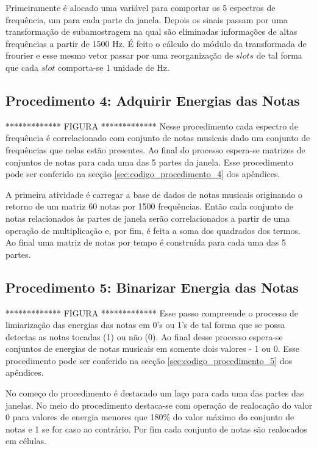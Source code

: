 Primeiramente é alocado uma variável para comportar os 5 espectros de frequência, um para cada parte da janela. Depois os sinais passam por uma transformação de subamostragem na qual são eliminadas informações de altas frequências a partir de 1500 Hz. É feito o cálculo do módulo da transformada de frourier e esse mesmo vetor passar por uma reorganização de $slots$ de tal forma que cada $slot$ comporta-se 1 unidade de Hz.

\subsection{Procedimento 4: Adquirir Energias das Notas}
\label{subsec:procedimento_4}

************* FIGURA *************
Nesse procedimento cada espectro de frequência é correlacionado com conjunto de notas musicais dado um conjunto de frequências que nelas estão presentes. Ao final do processo espera-se matrizes de conjuntos de notas para cada uma das 5 partes da janela. Esse procedimento pode ser conferido na secção \ref{sec:codigo_procedimento_4} dos apêndices.


A primeira atividade é carregar a base de dados de notas musicais originando o retorno de um matriz 60 notas por 1500 frequências. Então cada conjunto de notas relacionados às partes de janela serão correlacionados a partir de uma operação de multiplicação e, por fim, é feita a soma dos quadrados dos termos. Ao final uma matriz de notas por tempo é construída para cada uma das 5 partes.

\subsection{Procedimento 5: Binarizar Energia das Notas}
\label{subsec:procedimento_5}

************* FIGURA *************
Esse passo compreende o processo de limiarização das energias das notas em 0's ou 1's de tal forma que se possa detectas as notas tocadas (1) ou não (0). Ao final desse processo espera-se conjuntos de energias de notas musicais em somente dois valores - 1 ou 0. Esse procedimento pode ser conferido na secção \ref{sec:codigo_procedimento_5} dos apêndices.


No começo do procedimento é destacado um laço para cada uma das partes das janelas. No meio do procedimento destaca-se com operação de realocação do valor 0 para valores de energia menores que 180\% do valor máximo do conjunto de notas e 1 se for caso ao contrário. Por fim cada conjunto de notas são realocados em células.

